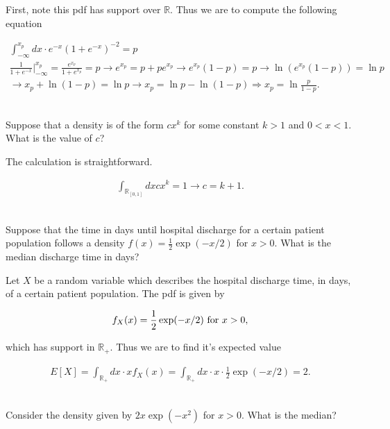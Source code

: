 \documentclass{homework}
\begin{document}
First, note this pdf has support over $\mathds{R}$. Thus we are to compute the following equation

\begin{align*}
    \int_{-\infty}^{x_p} dx \cdot e^{-x}(1+e^{-x})^{-2} = p \\
    \frac{1}{1+ e^{-x}}\bigg |_{-\infty}^{x_p} = \frac{e^{x_p}}{1+e^{x_p}} = p \longrightarrow e^{x_p}=p+pe^{x_p} \longrightarrow e^{x_p} (1-p) = p \longrightarrow \ln (e^{x_p} (1-p)) = \ln p \\ \longrightarrow x_p + \ln (1-p) = \ln p \longrightarrow x_p = \ln p - \ln (1-p) \Longrightarrow x_p = \ln \frac{p}{1-p}.
\end{align*} \\

\begin{tcolorbox}[title=Question 7]
Suppose that a density is of the form $cx^k$ for some constant $k > 1$ and $0 < x < 1$. What is the value of $c$?
\end{tcolorbox}

The calculation is straightforward.

\begin{align*}
    \int_{\mathds{R}_{[0,1]}}dx cx^{k} = 1 \longrightarrow c = k+1.
\end{align*} \\

\begin{tcolorbox}[title=Question 8]
Suppose that the time in days until hospital discharge for a certain patient population follows a density $f(x) = \frac{1}{2} \exp(-x/2)$ for $x > 0$.  What is the median discharge time in days?
\end{tcolorbox}

Let $X$ be a random variable which describes the hospital discharge time, in days, of a certain patient population. The pdf is given by 

$$
f_X(x)= \frac{1}{2} \exp(-x/2) \textnormal{ for } x > 0,
$$

which has support in $\mathds{R}_{+}$. Thus we are to find it's expected value

\begin{align*}
    E[X] = \int_{\mathds{R}_{+}} dx \cdot x f_{X}(x) =  \int_{\mathds{R}_{+}} dx \cdot x \cdot \frac{1}{2} \exp(-x/2) = 2. 
\end{align*} \\


\begin{tcolorbox}[title=Question 9]
Consider the density given by $2x \exp\left(-x^2 \right)$ for $x > 0$. What is the median?
\end{tcolorbox}
\end{document}

